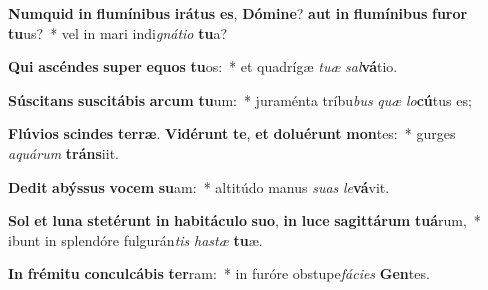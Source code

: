 \item \textbf{Num}\textbf{quid} \textbf{in} \textbf{flu}\textbf{mí}\textbf{ni}\textbf{bus} \textbf{i}\textbf{rá}\textbf{tus} \textbf{es}, \textbf{Dó}\textbf{mi}\textbf{ne}? \textbf{aut} \textbf{in} \textbf{flu}\textbf{mí}\textbf{ni}\textbf{bus} \textbf{fu}\textbf{ror} \textbf{tu}us?~* vel in mari indi\textit{gná}\textit{ti}\textit{o} \textbf{tu}a?
\item \textbf{Qui} \textbf{a}\textbf{scén}\textbf{des} \textbf{su}\textbf{per} \textbf{e}\textbf{quos} \textbf{tu}os:~* et quadrígæ \textit{tu}\textit{æ} \textit{sal}\textbf{vá}tio.
\item \textbf{Sú}\textbf{sci}\textbf{tans} \textbf{su}\textbf{sci}\textbf{tá}\textbf{bis} \textbf{ar}\textbf{cum} \textbf{tu}um:~* juraménta tríbu\textit{bus} \textit{quæ} \textit{lo}\textbf{cú}tus es;
\item \textbf{Flú}\textbf{vi}\textbf{os} \textbf{scin}\textbf{des} \textbf{ter}\textbf{ræ}. \textbf{Vi}\textbf{dé}\textbf{runt} \textbf{te}, \textbf{et} \textbf{do}\textbf{lu}\textbf{é}\textbf{runt} \textbf{mon}tes:~* gurges \textit{a}\textit{quá}\textit{rum} \textbf{tráns}iit.
\item \textbf{De}\textbf{dit} \textbf{a}\textbf{býs}\textbf{sus} \textbf{vo}\textbf{cem} \textbf{su}am:~* altitúdo manus \textit{su}\textit{as} \textit{le}\textbf{vá}vit.
\item \textbf{Sol} \textbf{et} \textbf{lu}\textbf{na} \textbf{ste}\textbf{té}\textbf{runt} \textbf{in} \textbf{ha}\textbf{bi}\textbf{tá}\textbf{cu}\textbf{lo} \textbf{su}\textbf{o}, \textbf{in} \textbf{lu}\textbf{ce} \textbf{sa}\textbf{git}\textbf{tá}\textbf{rum} \textbf{tu}\textbf{á}rum,~* ibunt in splendóre fulgurán\textit{tis} \textit{has}\textit{tæ} \textbf{tu}æ.
\item \textbf{In} \textbf{fré}\textbf{mi}\textbf{tu} \textbf{con}\textbf{cul}\textbf{cá}\textbf{bis} \textbf{ter}ram:~* in furóre obstupe\textit{fá}\textit{ci}\textit{es} \textbf{Gen}tes.
